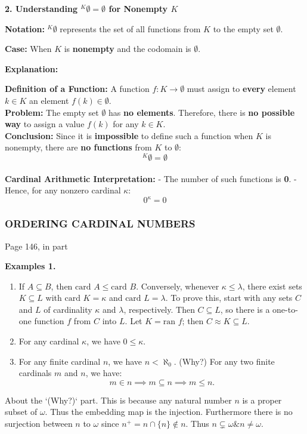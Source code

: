 \textbf{2. Understanding \({}^K \emptyset = \emptyset\) for Nonempty \(K\)}

\textbf{Notation:} \({}^K \emptyset\) represents the set of all functions from \(K\) to the empty set \(\emptyset\).

\textbf{Case:} When \(K\) is \textbf{nonempty} and the codomain is \(\emptyset\).

\textbf{Explanation:}

\textbf{Definition of a Function:} A function \(f: K \to \emptyset\) must assign to \textbf{every} element \(k \in K\) an element \(f(k) \in \emptyset\). \\
\textbf{Problem:} The empty set \(\emptyset\) has \textbf{no elements}. Therefore, there is \textbf{no possible way} to assign a value \(f(k)\) for any \(k \in K\). \\
\textbf{Conclusion:} Since it is \textbf{impossible} to define such a function when \(K\) is nonempty, there are \textbf{no functions} from \(K\) to \(\emptyset\):
  \[
  {}^K \emptyset = \emptyset
  \] \\ 
\textbf{Cardinal Arithmetic Interpretation:}
    - The number of such functions is \textbf{0}.
    - Hence, for any nonzero cardinal \(\kappa\):
      \[
      0^\kappa = 0
      \]
\subsubsection{ORDERING CARDINAL NUMBERS}
Page 146, in part
\begin{leftbar}
    \textbf{Examples 1.} 
    \begin{enumerate}
        \item If \(A \subseteq B\), then \(\text{card } A \leq \text{card } B\). Conversely, whenever \(\kappa \leq \lambda\), there exist sets \(K \subseteq L\) with \(\text{card } K = \kappa\) and \(\text{card } L = \lambda\). To prove this, start with any sets \(C\) and \(L\) of cardinality \(\kappa\) and \(\lambda\), respectively. Then \(C \subseteq L\), so there is a one-to-one function \(f\) from \(C\) into \(L\). Let \(K = \text{ran } f\); then \(C \approx K \subseteq L\).
        \item For any cardinal \(\kappa\), we have \(0 \leq \kappa\).
        \item For any finite cardinal \(n\), we have \(n < \aleph_0\). (Why?) For any two finite cardinals \(m\) and \(n\), we have:
        \[
        m \in n \implies m \subseteq n \implies m \leq n.
        \]
    \end{enumerate}
\end{leftbar}
About the `(Why?)` part. This is because any natural number \(n\) is a proper subset of \(\omega\). Thus the embedding map is the injection. Furthermore there is no surjection between \(n\) to \(\omega\) since \(n^+ = n \cap \{n\} \notin n\). Thus \(n \subsetneq \omega \& n \neq \omega\).


